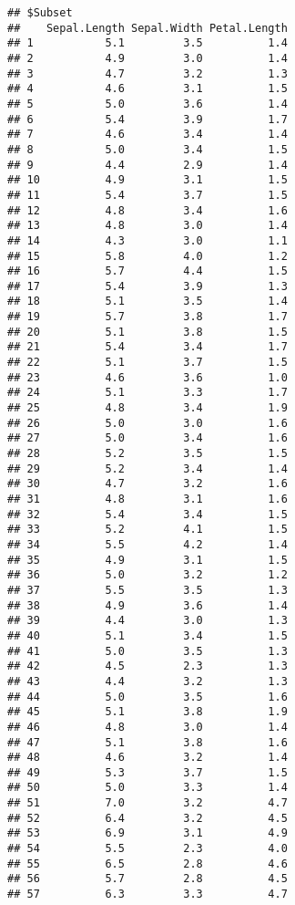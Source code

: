 \documentclass[
]{article}
\begin{document}
\begin{verbatim}
## $Subset
##    Sepal.Length Sepal.Width Petal.Length
## 1           5.1         3.5          1.4
## 2           4.9         3.0          1.4
## 3           4.7         3.2          1.3
## 4           4.6         3.1          1.5
## 5           5.0         3.6          1.4
## 6           5.4         3.9          1.7
## 7           4.6         3.4          1.4
## 8           5.0         3.4          1.5
## 9           4.4         2.9          1.4
## 10          4.9         3.1          1.5
## 11          5.4         3.7          1.5
## 12          4.8         3.4          1.6
## 13          4.8         3.0          1.4
## 14          4.3         3.0          1.1
## 15          5.8         4.0          1.2
## 16          5.7         4.4          1.5
## 17          5.4         3.9          1.3
## 18          5.1         3.5          1.4
## 19          5.7         3.8          1.7
## 20          5.1         3.8          1.5
## 21          5.4         3.4          1.7
## 22          5.1         3.7          1.5
## 23          4.6         3.6          1.0
## 24          5.1         3.3          1.7
## 25          4.8         3.4          1.9
## 26          5.0         3.0          1.6
## 27          5.0         3.4          1.6
## 28          5.2         3.5          1.5
## 29          5.2         3.4          1.4
## 30          4.7         3.2          1.6
## 31          4.8         3.1          1.6
## 32          5.4         3.4          1.5
## 33          5.2         4.1          1.5
## 34          5.5         4.2          1.4
## 35          4.9         3.1          1.5
## 36          5.0         3.2          1.2
## 37          5.5         3.5          1.3
## 38          4.9         3.6          1.4
## 39          4.4         3.0          1.3
## 40          5.1         3.4          1.5
## 41          5.0         3.5          1.3
## 42          4.5         2.3          1.3
## 43          4.4         3.2          1.3
## 44          5.0         3.5          1.6
## 45          5.1         3.8          1.9
## 46          4.8         3.0          1.4
## 47          5.1         3.8          1.6
## 48          4.6         3.2          1.4
## 49          5.3         3.7          1.5
## 50          5.0         3.3          1.4
## 51          7.0         3.2          4.7
## 52          6.4         3.2          4.5
## 53          6.9         3.1          4.9
## 54          5.5         2.3          4.0
## 55          6.5         2.8          4.6
## 56          5.7         2.8          4.5
## 57          6.3         3.3          4.7

\end{verbatim}
\end{document}
